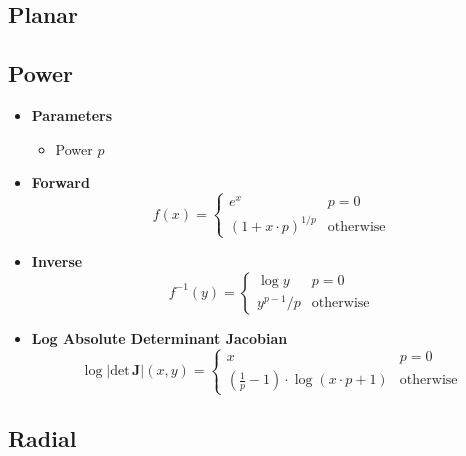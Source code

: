 \subsection{Planar}

\subsection{Power}
\begin{itemize}
  \item \textbf{Parameters}
  \begin{itemize}
    \item Power $p$
  \end{itemize}
  \item \textbf{Forward}
  \begin{equation}
    f(x) = \begin{cases} e^x & p = 0 \\ \left( 1 + x \cdot p \right) ^ {1 / p} & \text{otherwise} \end{cases}
  \end{equation}
  \item \textbf{Inverse}
  \begin{equation}
    f^{-1}(y) = \begin{cases} \log y & p = 0 \\ y^{p - 1} / p & \text{otherwise} \end{cases}
  \end{equation}
  \item \textbf{Log Absolute Determinant Jacobian}
  \begin{equation}
    \log \vert \text{det} \, \mathbf{J} \vert (x, y) = \begin{cases} x & p = 0 \\ \left(\frac{1}{p} - 1 \right) \cdot \log \left(x \cdot p + 1 \right) & \text{otherwise} \end{cases}
  \end{equation}
\end{itemize}

\subsection{Radial}

